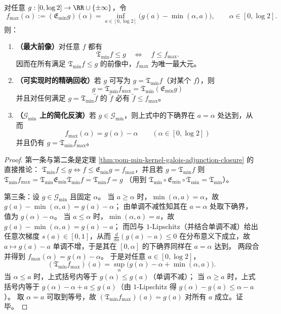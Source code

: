 \begin{theorem}\label{thm:pom-min-kernel-projection-and-inversion}
对任意 \(g:[0,\log 2]\to\RR\cup\{\pm\infty\}\)，令
\begin{equation}\label{eq:pom-min-kernel-inversion-f-from-g}
\boxed{\;
f_{\max}(\alpha):=(\mathfrak{E}_{\min}g)(\alpha)
=\inf_{a\in[0,\log 2]}\bigl(g(a)-\min(\alpha,a)\bigr),\qquad \alpha\in[0,\log 2].\;}
\end{equation}
则：
\begin{enumerate}
  \item \textbf{（最大前像）}对任意 \(f\) 都有
  \[
  \mathfrak{T}_{\min}f\le g\quad\Longleftrightarrow\quad f\le f_{\max}.
  \]
  因而在所有满足 \(\mathfrak{T}_{\min}f\le g\) 的前像中，\(f_{\max}\) 为唯一最大元。
  \item \textbf{（可实现时的精确回收）}若 \(g\) 可写为 \(g=\mathfrak{T}_{\min}f\)（对某个 \(f\)），则
  \[
  \boxed{\;
  g=\mathfrak{T}_{\min}f_{\max}=\mathfrak{T}_{\min}(\mathfrak{E}_{\min}g)\;}
  \]
  并且对任何满足 \(g=\mathfrak{T}_{\min}\tilde f\) 的 \(\tilde f\) 必有 \(\tilde f\le f_{\max}\)。
  \item \textbf{（\(\mathcal{G}_{\min}\) 上的简化反演）}若 \(g\in\mathcal{G}_{\min}\)，则上式中的下确界在 \(a=\alpha\) 处达到，从而
  \[
  \boxed{\;
  f_{\max}(\alpha)=g(\alpha)-\alpha\qquad(\alpha\in[0,\log 2])\;}
  \]
  并且仍有 \(g=\mathfrak{T}_{\min}f_{\max}\)。
\end{enumerate}
\end{theorem}
\begin{proof}
第一条与第二条是定理 \ref{thm:pom-min-kernel-galois-adjunction-closure} 的直接推论：
\(\mathfrak{T}_{\min}f\le g\Longleftrightarrow f\le \mathfrak{E}_{\min}g=f_{\max}\)，并且若 \(g=\mathfrak{T}_{\min}f\) 则
\(
\mathfrak{T}_{\min}f_{\max}
=\mathfrak{T}_{\min}\mathfrak{E}_{\min}\mathfrak{T}_{\min}f
=\mathfrak{T}_{\min}f=g
\)
（用到 \(\mathfrak{T}_{\min}\circ\mathfrak{E}_{\min}\circ\mathfrak{T}_{\min}=\mathfrak{T}_{\min}\)）。
\par
第三条：设 \(g\in\mathcal{G}_{\min}\) 且固定 \(\alpha\)。
当 \(a\ge \alpha\) 时，\(\min(\alpha,a)=\alpha\)，故 \(g(a)-\min(\alpha,a)=g(a)-\alpha\)；
由单调不减性知其在 \(a=\alpha\) 处取下确界，值为 \(g(\alpha)-\alpha\)。
当 \(a\le \alpha\) 时，\(\min(\alpha,a)=a\)，故 \(g(a)-\min(\alpha,a)=g(a)-a\)；
而凹与 \(1\)-Lipschitz（并结合单调不减）给出任意次梯度 \(s(a)\in[0,1]\)，从而
\(
\frac{d}{da}(g(a)-a)\le 0
\)
在分布意义下成立，故 \(a\mapsto g(a)-a\) 单调不增，于是其在 \([0,\alpha]\) 的下确界同样在 \(a=\alpha\) 达到。
两段合并得到 \(f_{\max}(\alpha)=g(\alpha)-\alpha\)。
于是对任意 \(a\in[0,\log 2]\)，
\[
(\mathfrak{T}_{\min}f_{\max})(a)
=\sup_{\alpha}\bigl(g(\alpha)-\alpha+\min(\alpha,a)\bigr).
\]
当 \(\alpha\le a\) 时，上式括号内等于 \(g(\alpha)\le g(a)\)（单调不减）；
当 \(\alpha\ge a\) 时，上式括号内等于 \(g(\alpha)-\alpha+a\le g(a)\)（由 \(1\)-Lipschitz 得 \(g(\alpha)-g(a)\le \alpha-a\)）。
取 \(\alpha=a\) 可取到等号，故 \((\mathfrak{T}_{\min}f_{\max})(a)=g(a)\) 对所有 \(a\) 成立。证毕。
\end{proof}

